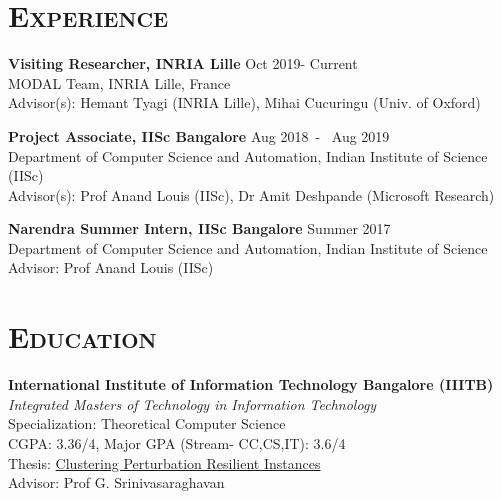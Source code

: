 \documentclass[line,margin]{res}
\begin{document}
\address{MODAL Team, INRIA Lille, France}
\address{Mail: \href{mailto:apoorv-vikram.singh@inria.fr}{\texttt{apoorv-vikram.singh@inria.fr}}}


\begin{resume}


\section{\textsc{Experience}}
                {\bf Visiting Researcher, INRIA Lille} \hfill Oct 2019- Current \\
                {MODAL Team, INRIA Lille, France}\\
                Advisor(s): Hemant Tyagi (INRIA Lille), Mihai Cucuringu (Univ. of Oxford)

                {\bf Project Associate, IISc Bangalore} \hfill Aug 2018~-~  Aug 2019 \\
                {Department of Computer Science and Automation, Indian Institute of Science (IISc)}\\
                Advisor(s): {Prof Anand Louis} (IISc), {Dr Amit Deshpande} (Microsoft Research)

                {\bf Narendra Summer Intern, IISc Bangalore} \hfill            Summer 2017 \\
                Department of Computer Science and Automation, Indian Institute of Science\\
                Advisor: {Prof Anand Louis} (IISc)



\section{\textsc{Education}} {\bf International Institute of Information Technology Bangalore (IIITB)}  \\
  {\sl Integrated Masters of Technology in Information Technology}\\
  {Specialization: Theoretical Computer Science \\
  CGPA: 3.36/4, Major GPA (Stream- CC,CS,IT): 3.6/4} \\
  Thesis: \href{https://www.dropbox.com/s/zoa8nx5xoiehbgd/thesis.pdf?dl=0}{Clustering Perturbation Resilient Instances} \\
  Advisor: {Prof G. Srinivasaraghavan}


\end{resume}
\end{document}
